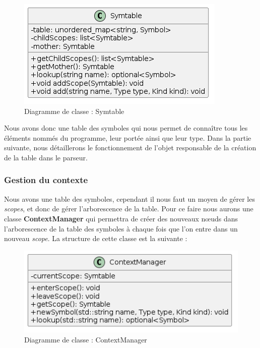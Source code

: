 \documentclass[a4paper]{article}%
\begin{document}
\begin{figure}[h!]
  \begin{center}
  \includegraphics[scale=0.5]{../ressources/diagrams/symtable2.png}
  \caption{Diagramme de classe : Symtable}
  \end{center}
\end{figure}

Nous avons donc une table des symboles qui nous permet de connaître tous les
éléments nommés du programme, leur portée ainsi que leur type. Dans la partie
suivante, nous détaillerons le fonctionnement de l'objet responsable de la
création de la table dans le parseur.

\clearpage
\subsubsection*{Gestion du contexte}

Nous avons une table des symboles, cependant il nous faut un moyen de gérer les
\textit{scopes}, et donc de gérer l'arborescence de la table. Pour ce faire nous
aurons une classe \textbf{ContextManager} qui permettra de créer des nouveaux
nœuds dans l'arborescence de la table des symboles à chaque fois que l'on entre
dans un nouveau \textit{scope}. La structure de cette classe est la suivante :

\begin{figure}[h!]
  \begin{center}
  \includegraphics[scale=0.5]{../ressources/diagrams/contextManager.png}
  \caption{Diagramme de classe : ContextManager}
  \end{center}
\end{figure}
\end{document}
